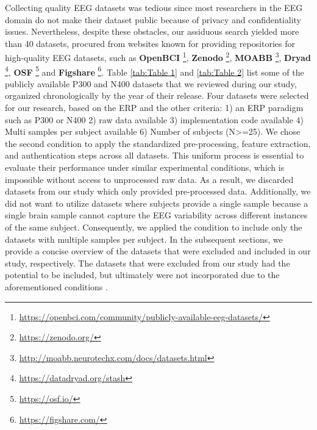 Collecting quality EEG datasets was tedious since most researchers in the EEG domain do not make their dataset public because of privacy and confidentiality issues. Nevertheless, despite these obstacles, our assiduous search yielded more than 40 datasets, procured from websites known for providing repositories for high-quality EEG datasets, such as \textbf{OpenBCI} \footnote{\url{https://openbci.com/community/publicly-available-eeg-datasets/}}, \textbf{Zenodo} \footnote{\url{https://zenodo.org/}}, \textbf{MOABB} \footnote{\url{http://moabb.neurotechx.com/docs/datasets.html}}, \textbf{Dryad} \footnote{\url{https://datadryad.org/stash}}, \textbf{OSF} \footnote{\url{https://osf.io/}} and \textbf{Figshare} \footnote{\url{https://figshare.com/}}. Table \autoref{tab:Table 1} and \autoref{tab:Table 2} list some of the publicly available P300 and N400 datasets that we reviewed during our study, organized chronologically by the year of their release. Four datasets \cite{bi2015a, cogbci, kappenman2021erp, mantegna2019distinguishing} were selected for our research, based on the ERP and the other criteria: 1) an ERP paradigm such as P300 or N400 2) raw data available 3) implementation code available 4) Multi samples per subject available 6) Number of subjects (N>=25). We chose the second condition to apply the standardized pre-processing, feature extraction, and authentication steps across all datasets. This uniform process is essential to evaluate their performance under similar experimental conditions, which is impossible without access to unprocessed raw data. As a result, we discarded datasets from our study which only provided pre-processed data. Additionally, we did not want to utilize datasets where subjects provide a single sample because a single brain sample cannot capture the EEG variability across different instances of the same subject. Consequently, we applied the condition to include only the datasets with multiple samples per subject. In the subsequent sections, we provide a concise overview of the datasets that were excluded and included in our study, respectively. The datasets that were excluded from our study had the potential to be included, but ultimately were not incorporated due to the aforementioned conditions \cite{}.  


